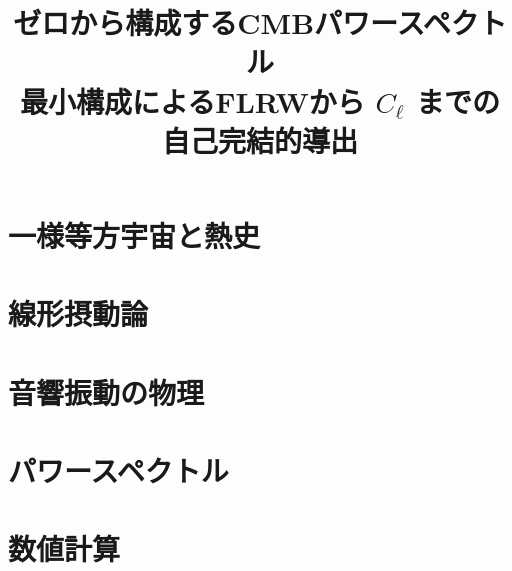 \documentclass[11pt]{ltjsarticle}
\title{ゼロから構成するCMBパワースペクトル\\
\large 最小構成によるFLRWから $C_\ell$ までの自己完結的導出}
\author{}
\date{}
\begin{document}
\maketitle
\tableofcontents

\part{一様等方宇宙と熱史}



\part{線形摂動論}




\part{音響振動の物理}



\part{パワースペクトル}



\part{数値計算}

\appendix







\end{document}
